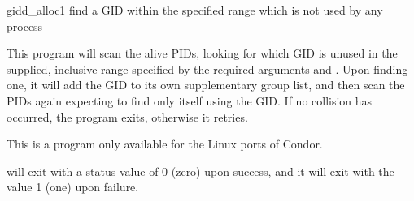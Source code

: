 \begin{ManPage}{\label{man-gidd-alloc}gidd\_alloc}{1}
{find a GID within the specified range which is not used by any process}
\Synopsis {}


\Description 

This program will scan the alive PIDs, looking for which GID is unused in
the supplied, inclusive range specified by the required arguments
 and . 
Upon finding one,
it will add the GID to its own supplementary group list,
and then scan the PIDs again expecting to find only itself using the GID. 
If no collision has occurred, the program exits, otherwise it retries.

	
\GenRem

This is a program only available for the Linux ports of Condor.

\ExitStatus

 will exit with a status value of 0 (zero) upon success,
and it will exit with the value 1 (one) upon failure.

\end{ManPage}
